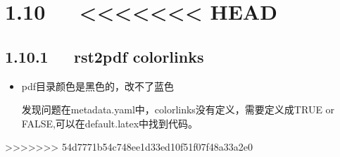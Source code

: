 \documentclass[letterpaper,12pt,english]{sphinxmanual}
\begin{document}
\section{1.10   <<<<<<< HEAD}
\label{\detokenize{001software/001install/pandoc:head}}

\subsection{1.10.1   rst2pdf colorlinks}
\label{\detokenize{001software/001install/pandoc:rst2pdf-colorlinks}}\begin{itemize}
\item {} 
pdf目录颜色是黑色的，改不了蓝色

发现问题在metadata.yaml中，colorlinks没有定义，需要定义成TRUE or FALSE,可以在default.latex中找到代码。

\begin{sphinxVerbatim}[commandchars=\\\{\}]
 
 
\end{sphinxVerbatim}

\end{itemize}

>>>>>>> 54d7771b54c748ee1d33ed10f51f07f48a33a2e0
\end{document}
